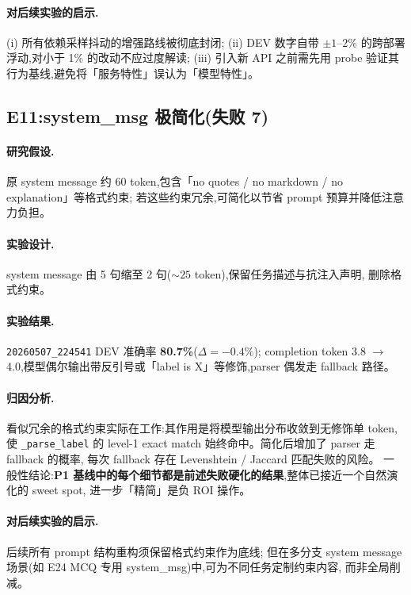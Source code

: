 \documentclass[11pt,a4paper]{ctexart}
\begin{document}
\paragraph{对后续实验的启示.}(i) 所有依赖采样抖动的增强路线被彻底封闭;
(ii) DEV 数字自带 $\pm 1$--$2\%$ 的跨部署浮动,对小于 1\% 的改动不应过度解读;
(iii) 引入新 API 之前需先用 probe 验证其行为基线,避免将「服务特性」误认为「模型特性」。

\subsection{E11:system\_msg 极简化(失败 7)}

\paragraph{研究假设.}原 system message 约 60 token,包含「no quotes / no markdown / no explanation」等格式约束;
若这些约束冗余,可简化以节省 prompt 预算并降低注意力负担。

\paragraph{实验设计.}system message 由 5 句缩至 2 句($\sim 25$ token),保留任务描述与抗注入声明,
删除格式约束。

\paragraph{实验结果.}\texttt{20260507\_224541} DEV 准确率 \textbf{80.7\%}($\Delta = -0.4\%$);
completion token 3.8 $\to$ 4.0,模型偶尔输出带反引号或「label is X」等修饰,parser 偶发走 fallback 路径。

\paragraph{归因分析.}看似冗余的格式约束实际在工作:其作用是将模型输出分布收敛到无修饰单 token,
使 \texttt{\_parse\_label} 的 level-1 exact match 始终命中。简化后增加了 parser 走 fallback 的概率,
每次 fallback 存在 Levenshtein / Jaccard 匹配失败的风险。
一般性结论:\textbf{P1 基线中的每个细节都是前述失败硬化的结果},整体已接近一个自然演化的 sweet spot,
进一步「精简」是负 ROI 操作。

\paragraph{对后续实验的启示.}后续所有 prompt 结构重构须保留格式约束作为底线;
但在多分支 system message 场景(如 E24 MCQ 专用 system\_msg)中,可为不同任务定制约束内容,
而非全局削减。
\end{document}
